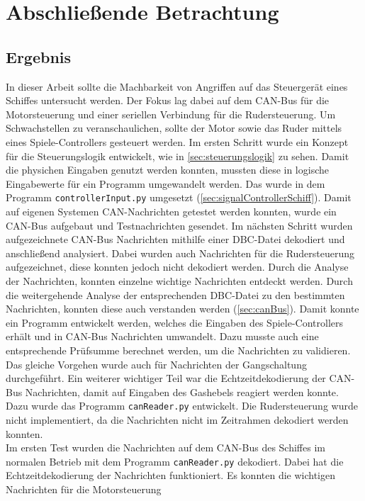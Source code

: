 \chapter{Abschließende Betrachtung}

\section{Ergebnis}
In dieser Arbeit sollte die Machbarkeit von Angriffen auf das Steuergerät eines Schiffes untersucht werden. 
Der Fokus lag dabei auf dem CAN-Bus für die Motorsteuerung und einer seriellen Verbindung für die Rudersteuerung.
Um Schwachstellen zu veranschaulichen, sollte der Motor sowie das Ruder mittels eines Spiele-Controllers gesteuert werden.
Im ersten Schritt wurde ein Konzept für die Steuerungslogik entwickelt, wie in \ref{sec:steuerungslogik} zu sehen.
Damit die physichen Eingaben genutzt werden konnten, mussten diese in logische Eingabewerte für ein Programm umgewandelt werden.
Das wurde in dem Programm \texttt{controllerInput.py} umgesetzt (\ref{sec:signalControllerSchiff}). 
Damit auf eigenen Systemen CAN-Nachrichten getestet werden konnten, wurde ein CAN-Bus aufgebaut und Testnachrichten gesendet.
Im nächsten Schritt wurden aufgezeichnete CAN-Bus Nachrichten mithilfe einer DBC-Datei dekodiert und anschließend analysiert. 
Dabei wurden auch Nachrichten für die Rudersteuerung aufgezeichnet, diese konnten jedoch nicht dekodiert werden.
Durch die Analyse der Nachrichten, konnten einzelne wichtige Nachrichten entdeckt werden. Durch die weitergehende Analyse
der entsprechenden DBC-Datei zu den bestimmten Nachrichten, konnten diese auch verstanden werden (\ref{sec:canBus}).
Damit konnte ein Programm entwickelt werden, welches die Eingaben des Spiele-Controllers erhält und in CAN-Bus Nachrichten umwandelt.
Dazu musste auch eine entsprechende Prüfsumme berechnet werden, um die Nachrichten zu validieren. Das gleiche Vorgehen wurde auch
für Nachrichten der Gangschaltung durchgeführt. Ein weiterer wichtiger Teil war die Echtzeitdekodierung der CAN-Bus Nachrichten,
damit auf Eingaben des Gashebels reagiert werden konnte. Dazu wurde das Programm \texttt{canReader.py} entwickelt. 
Die Rudersteuerung wurde nicht implementiert, da die Nachrichten nicht im Zeitrahmen dekodiert werden konnten.
\\
Im ersten Test wurden die Nachrichten auf dem CAN-Bus des Schiffes im normalen Betrieb mit dem Programm \texttt{canReader.py} dekodiert.
Dabei hat die Echtzeitdekodierung der Nachrichten funktioniert. Es konnten die wichtigen Nachrichten für die Motorsteuerung
